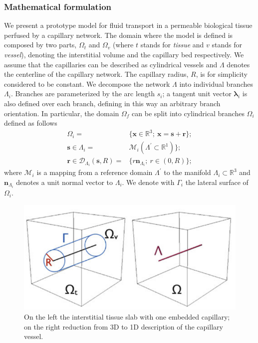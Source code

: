 \documentclass[10pt]{article} %
\def\R{\mathbb{R}}
\def\xx{\boldsymbol x}
\def\rr{\boldsymbol r}
\def\ss{\boldsymbol s}
\def\nn{\boldsymbol n}
\begin{document}
	\subsubsection{Mathematical formulation}
	We present a prototype model for fluid transport in a permeable biological tissue perfused by a capillary network. 
	The domain where the model is defined is composed by two parts, $\Omega_t$ and $\Omega_v$ (where $t$ stands for \textit{tissue} and $v$ stands for \textit{vessel}), denoting the interstitial volume and the capillary bed respectively.
	We assume that the capillaries can be described as cylindrical vessels and  $\Lambda$ denotes the centerline of the capillary network. The capillary radius, $R$, is for simplicity considered to be constant.  We decompose the network $\Lambda$ into individual branches $\Lambda_i$. Branches are parameterized by the arc length $s_i$; a tangent unit vector $\boldsymbol \lambda_i$ is also defined over each branch, defining in this way an arbitrary branch orientation. In particular, the domain $\Omega_f$ can be split into cylindrical branches $\Omega_i$ defined as follows
	\begin{align*}
		\Omega_i = & \{ \xx \in \R^3; \ \xx = \ss + \rr\}; \\
		\ss \in \Lambda_i = & \mathcal{M}_i(\Lambda^\prime \subset \R^1)\}; \\
		\rr \in \mathcal{D}_{\Lambda_i}(\ss,R) = & \{ r \nn_{\Lambda_i}; \ r\in(0,R)\};
	\end{align*}
	where $\mathcal{M}_i$ is a mapping from a reference domain $\Lambda^\prime$ to the manifold $\Lambda_i \subset \R^3$ and $\nn_{\Lambda_i}$ denotes a unit normal vector to $\Lambda_i$. We denote with $\Gamma_i$ the lateral surface of $\Omega_i$. 
	
	\begin{figure}
		\centering
		\includegraphics[width=0.7\linewidth]{"3d-1d domain"}
		\caption[Fig. 1]{On the left the interstitial tissue slab with one embedded capillary; on the right reduction from 3D to 1D description of the capillary vessel.}
		\label{fig:3d-1d-domain}
	\end{figure}	
	
\end{document}
